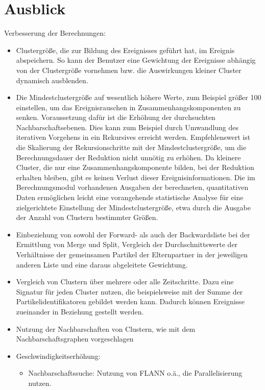 \chapter{Ausblick}
Verbesserung der Berechnungen:
\begin{itemize}
	\item Clustergröße, die zur Bildung des Ereignisses geführt hat, im Ereignis abspeichern. So kann der Benutzer eine Gewichtung der Ereignisse abhängig von der Clustergröße vornehmen bzw. die Auswirkungen kleiner Cluster dynamisch ausblenden.
	
	\item Die Mindestclustergröße auf wesentlich höhere Werte, zum Beispiel größer 100 einstellen, um das Ereignisrauschen in Zusammenhangskomponenten zu senken. Voraussetzung dafür ist die Erhöhung der durchsuchten Nachbarschaftsebenen. Dies kann zum Beispiel durch Umwandlung des iterativen Vorgehens in ein Rekursives erreicht werden. Empfehlenswert ist die Skalierung der Rekursionschritte mit der Mindestclustergröße, um die Berechnungsdauer der Reduktion nicht unnötig zu erhöhen. Da kleinere Cluster, die nur eine Zusammenhangskomponente bilden, bei der Reduktion erhalten bleiben, gibt es keinen Verlust dieser Ereignisinformationen.
	Die im Berechnungsmodul vorhandenen Ausgaben der berechneten, quantitativen Daten ermöglichen leicht eine vorangehende statistische Analyse für eine zielgerichtete Einstellung der Mindestclustergröße, etwa durch die Ausgabe der Anzahl von Clustern bestimmter Größen.
	
	\item Einbeziehung von sowohl der Forward- als auch der Backwardsliste bei der Ermittlung von Merge und Split, Vergleich der Durchschnittswerte der Verhältnisse der gemeinsamen Partikel der Elternpartner in der jeweiligen anderen Liste und eine daraus abgeleitete Gewichtung.
	
	\item Vergleich von Clustern über mehrere oder alle Zeitschritte. Dazu eine Signatur für jeden Cluster nutzen, die beispielsweise mit der Summe der Partikelidentifikatoren gebildet werden kann. Dadurch können Ereignisse zueinander in Beziehung gestellt werden.
	
	\item Nutzung der Nachbarschaften von Clustern, wie mit dem Nachbarschaftsgraphen vorgeschlagen
	
	\item Geschwindigkeitserhöhung:
	\begin{itemize}
		\item Nachbarschaftssuche: Nutzung von FLANN o.ä., die Parallelisierung nutzen. \cite{ohara2013annAlgo}
		

\end{itemize}
\end{itemize}
